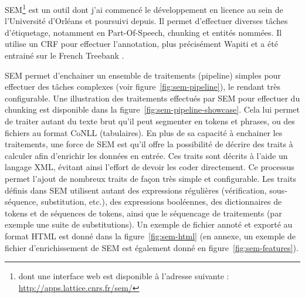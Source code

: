 \documentclass[citation\_needed]{subfiles}
\begin{document}
SEM\footnote{dont une interface web est disponible à l'adresse suivante : \url{http://apps.lattice.cnrs.fr/sem/}} \citep{tellier2012segmenteur,dupont2014reconnaisseur} est un outil dont j'ai commencé le développement en licence au sein de l'Université d'Orléans et poursuivi depuis. Il permet d'effectuer diverses tâches d'étiquetage, notamment en Part-Of-Speech, chunking et entités nommées. Il utilise un CRF pour effectuer l'annotation, plus précisément Wapiti \citep{lavergne10} et a été entrainé sur le French Treebank \cite{Abeille03,sagot2012annotation}.

SEM permet d'enchainer un ensemble de traitements (pipeline) simples pour effectuer des tâches complexes (voir figure\ \ref{fig:sem-pipeline}), le rendant très configurable. Une illustration des traitements effectués par SEM pour effectuer du chunking est disponible dans la figure\ \ref{fig:sem-pipeline-showcase}. Cela lui permet de traiter autant du texte brut qu'il peut segmenter en tokens et phrases, ou des fichiers au format CoNLL (tabulaires). En plus de sa capacité à enchainer les traitements, une force de SEM est qu'il offre la possibilité de décrire des traits à calculer afin d'enrichir les données en entrée. Ces traits sont décrits à l'aide un langage XML, évitant ainsi l'effort de devoir les coder directement. Ce processus permet l'ajout de nombreux traits de façon très simple et configurable. Les traits définis dans SEM utilisent autant des expressions régulières (vérification, sous-séquence, substitution, etc.), des expressions booléennes, des dictionnaires de tokens et de séquences de tokens, ainsi que le séquencage de traitements (par exemple une suite de substitutions). Un exemple de fichier annoté et exporté au format HTML est donné dans la figure\ \ref{fig:sem-html} (en annexe, un exemple de fichier d'enrichissement de SEM est également donné en figure\ \ref{fig:sem-features}).
\end{document}
